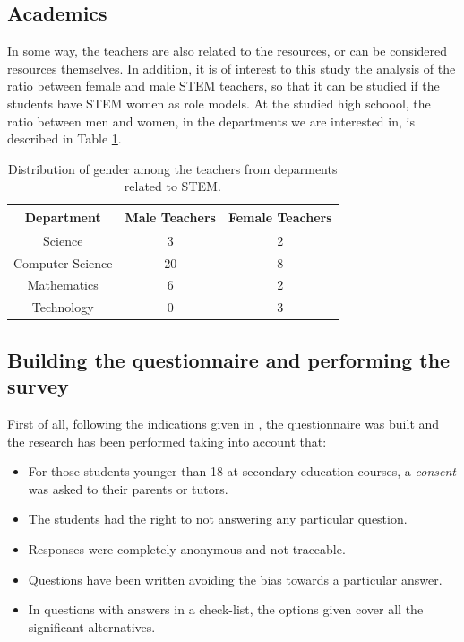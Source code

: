 \documentclass[journal,transmag]{IEEEtran}
\begin{document}
\subsection{Academics}

In some way, the teachers are also related to the resources, or can be considered resources themselves. In addition, it is of interest to this study the analysis of the ratio between female and male STEM teachers, so that it can be studied if the students have STEM women as role models. At the studied high schoool, the ratio between men and women, in the departments we are interested in, is described in Table \ref{tab:teachers}.

\begin{table}
	\caption[Teachers in STEM departments]{Distribution of gender among the teachers from deparments related to STEM.}
	\label{tab:teachers}
	
	\begin{center}
		\begin{tabular}{|c|c|c|}
			\hline
			\textbf{Department} & \textbf{Male Teachers} & \textbf{Female Teachers} \\ \hline
			Science & 3 & 2 \\ \hline
			Computer Science & 20 & 8 \\ \hline
			Mathematics & 6 & 2 \\ \hline
			Technology & 0 & 3 \\
			\hline
		\end{tabular}
	\end{center}
\end{table}

\subsection{Building the questionnaire and performing the survey}

First of all, following the indications given in \cite{cohen2013research}, the questionnaire was built and the research has been performed taking into account that:

\begin{itemize}
  \item For those students younger than 18 at secondary education courses, a \textit{consent} was asked to their parents or tutors.
  \item The students had the right to not answering any particular question.
  \item Responses were completely anonymous and not traceable.
  \item Questions have been written avoiding the bias towards a particular answer.
  \item In questions with answers in a check-list, the options given cover all the significant alternatives.
\end{itemize}
\end{document}

